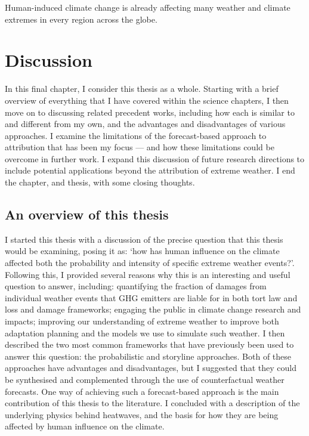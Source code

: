 {\onehalfspacing%
\begin{savequote}[8cm]
  Human-induced climate change is already affecting many weather and climate extremes in every region across the globe.
\end{savequote}
    
\chapter{\label{discussion}Discussion} 

In this final chapter, I consider this thesis as a whole. Starting with a brief overview of everything that I have covered within the science chapters, I then move on to discussing related precedent works, including how each is similar to and different from my own, and the advantages and disadvantages of various approaches. I examine the limitations of the forecast-based approach to attribution that has been my focus --- and how these limitations could be overcome in further work. I expand this discussion of future research directions to include potential applications beyond the attribution of extreme weather. I end the chapter, and thesis, with some closing thoughts.

\clearpage

\minitoc

\clearpage}

\section{An overview of this thesis}\label{discussion:overview}

  I started this thesis with a discussion of the precise question that this thesis would be examining, posing it as: `how has human influence on the climate affected both the probability and intensity of specific extreme weather events?'. Following this, I provided several reasons why this is an interesting and useful question to answer, including: quantifying the fraction of damages from individual weather events that GHG emitters are liable for in both tort law and loss and damage frameworks; engaging the public in climate change research and impacts; improving our understanding of extreme weather to improve both adaptation planning and the models we use to simulate such weather. I then described the two most common frameworks that have previously been used to answer this question: the probabilistic and storyline approaches. Both of these approaches have advantages and disadvantages, but I suggested that they could be synthesised and complemented through the use of counterfactual weather forecasts. One way of achieving such a forecast-based approach is the main contribution of this thesis to the literature. I concluded with a description of the underlying physics behind heatwaves, and the basis for how they are being affected by human influence on the climate.

